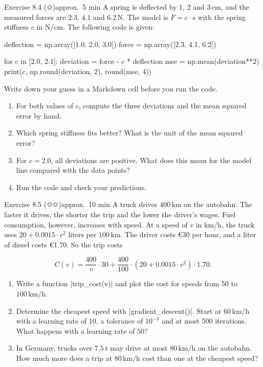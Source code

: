 \documentclass[paper=a4, fontsize=11pt, parskip=half]{scrartcl}
\begin{document}
\clearpage
\begin{aufgabe}{Exercise 8.4 (✩)}{approx.\ 5 min}
A spring is deflected by $1$, $2$ and $3\,\text{cm}$, and the measured forces are $2.3$, $4.1$ and $6.2\,\text{N}$. The model is $F = c \cdot s$ with the spring stiffness $c$ in N/cm. The following code is given:

\begin{code}
deflection = np.array([1.0, 2.0, 3.0])
force = np.array([2.3, 4.1, 6.2])

for c in [2.0, 2.1]:
    deviation = force - c * deflection
    mse = np.mean(deviation**2)
    print(c, np.round(deviation, 2), round(mse, 4))
\end{code}

Write down your guess in a Markdown cell before you run the code.

\begin{enumerate}
  \item For both values of $c$, compute the three deviations and the mean squared error by hand.
  \item Which spring stiffness fits better? What is the unit of the mean squared error?
  \item For $c = 2.0$, all deviations are positive. What does this mean for the model line compared with the data points?
  \item Run the code and check your predictions.
\end{enumerate}

\end{aufgabe}

\clearpage
\begin{aufgabe}{Exercise 8.5 (✩✩)}{approx.\ 10 min}
A truck drives $400\,\text{km}$ on the autobahn. The faster it drives, the shorter the trip and the lower the driver's wages. Fuel consumption, however, increases with speed. At a speed of $v$ in km/h, the truck uses $20 + 0.0015 \cdot v^2$ liters per $100\,\text{km}$. The driver costs €30 per hour, and a liter of diesel costs €1.70. So the trip costs

\[
C(v) = \frac{400}{v} \cdot 30 + \frac{400}{100} \cdot (20 + 0.0015 \cdot v^2) \cdot 1.70.
\]

\begin{enumerate}
  \item Write a function \py|trip_cost(v)| and plot the cost for speeds from $50$ to $100\,\text{km/h}$.
  \item Determine the cheapest speed with \py|gradient_descent()|. Start at $60\,\text{km/h}$ with a learning rate of $10$, a tolerance of $10^{-3}$ and at most 500 iterations. What happens with a learning rate of $50$?
  \item In Germany, trucks over $7.5\,\text{t}$ may drive at most $80\,\text{km/h}$ on the autobahn. How much more does a trip at $80\,\text{km/h}$ cost than one at the cheapest speed?
\end{enumerate}

\end{aufgabe}
\end{document}
